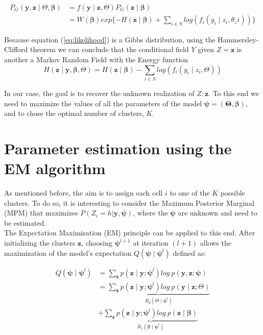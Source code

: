 \begin{align}
\label{eq:likelihood}
P_G(\boldsymbol{y},\boldsymbol{z} \mid \Theta, \boldsymbol{\beta}) &= f(\boldsymbol{y} \mid \boldsymbol{z}, \Theta)P_G(\boldsymbol{z} \mid \boldsymbol{\beta})\nonumber\\
&= W(\boldsymbol{\beta})exp\{{-H(\boldsymbol{z} \mid \boldsymbol{\beta})} + \sum\limits_{i \in S}log(f_i(y_i \mid z_i, \theta_zi))\}
\end{align}

Because equation (\ref{eq:likelihood}) is a Gibbs distribution, using the Hammersley-Clifford theorem we can conclude that the conditional field $Y$ given $Z =\boldsymbol{z}$ is another a Markov Random Field with the Energy function 
\[H(\boldsymbol{z} \mid \boldsymbol{y}, \boldsymbol{\beta}, \Theta) = H(\boldsymbol{z} \mid \boldsymbol{\beta}) - \sum\limits_{i \in S} log(f_i(y_i \mid z_i, \Theta))\]

In our case, the goal is to recover the unknown realization of $Z: \boldsymbol{z}$. To this end we need to maximize the values of all the parameters of the model $\boldsymbol{\psi} = (\boldsymbol{\Theta}, \boldsymbol{\beta})$, and to chose the optimal number of clusters, $K$.

\section{Parameter estimation using the EM algorithm}
As mentioned before, the aim is to assign each cell $i$ to one of the $K$ possible clusters. To do so, it is interesting to consider the Maximum Posterior Marginal (MPM) that maximizes $P(Z_{i}=h|\boldsymbol{y}, \boldsymbol{\psi})$, where the $\boldsymbol{\psi}$ are unknown and need to be estimated.\\

The Expectation Maximisation \cite{dempster77} (EM) principle can be applied to this end. After initializing the clusters $\boldsymbol{z}$,  choosing $\boldsymbol{\psi}^{l+1}$ at iteration $(l+1)$ allows the maximization of the model's expectation $Q(\boldsymbol{\psi} \mid \boldsymbol{\psi}^{l})$ defined as:

\begin{align}
Q(\boldsymbol{\psi} \mid \boldsymbol{\psi}^{l}) &= \sum\limits_{\boldsymbol{z}} p(\boldsymbol{z} \mid \boldsymbol{y} ; \boldsymbol{\psi}^{l}) log\:p(\boldsymbol{y},\boldsymbol{z};\boldsymbol{\psi}) \nonumber\\ 
\label{eq:decomposed}
&= \underbrace{\sum\limits_{\boldsymbol{z}} p(\boldsymbol{z} \mid \boldsymbol{y} ; \boldsymbol{\psi}^{l}) log\:p(\boldsymbol{y} \mid \boldsymbol{z} ; \Theta)}_{R_y(\Theta\mid \boldsymbol{\psi}^l)} \nonumber\\
 &+ \underbrace{\sum\limits_{\boldsymbol{z}} p(\boldsymbol{z} \mid \boldsymbol{y} ; \boldsymbol{\psi}^{l}) log\:p(\boldsymbol{z} \mid \boldsymbol{\beta})}_{R_z(\boldsymbol{\beta}\mid \boldsymbol{\psi}^l)}
\end{align}

